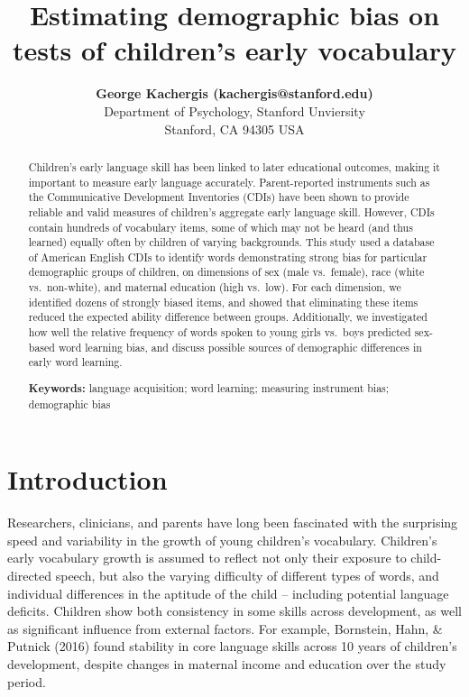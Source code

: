 \documentclass[10pt, letterpaper]{article}
\title{Estimating demographic bias on tests of children's early
vocabulary}
\author{{\large \bf George Kachergis (kachergis@stanford.edu)} \AND {\large \bf Nathan Francis (nathan99@stanford.edu)} \AND {\large \bf Michael C. Frank (mcfrank@stanford.edu)} \\ Department of Psychology, Stanford Unviersity \\ Stanford, CA 94305 USA }
\begin{document}
\maketitle

\begin{abstract}
Children's early language skill has been linked to later educational
outcomes, making it important to measure early language accurately.
Parent-reported instruments such as the Communicative Development
Inventories (CDIs) have been shown to provide reliable and valid
measures of children's aggregate early language skill. However, CDIs
contain hundreds of vocabulary items, some of which may not be heard
(and thus learned) equally often by children of varying backgrounds.
This study used a database of American English CDIs to identify words
demonstrating strong bias for particular demographic groups of children,
on dimensions of sex (male vs.~female), race (white vs.~non-white), and
maternal education (high vs.~low). For each dimension, we identified
dozens of strongly biased items, and showed that eliminating these items
reduced the expected ability difference between groups. Additionally, we
investigated how well the relative frequency of words spoken to young
girls vs.~boys predicted sex-based word learning bias, and discuss
possible sources of demographic differences in early word learning.

\textbf{Keywords:}
language acquisition; word learning; measuring instrument bias;
demographic bias
\end{abstract}

\hypertarget{introduction}{%
\section{Introduction}\label{introduction}}

Researchers, clinicians, and parents have long been fascinated with the
surprising speed and variability in the growth of young children's
vocabulary. Children's early vocabulary growth is assumed to reflect not
only their exposure to child-directed speech, but also the varying
difficulty of different types of words, and individual differences in
the aptitude of the child -- including potential language deficits.
Children show both consistency in some skills across development, as
well as significant influence from external factors. For example,
Bornstein, Hahn, \& Putnick (2016) found stability in core language
skills across 10 years of children's development, despite changes in
maternal income and education over the study period.
\end{document}
